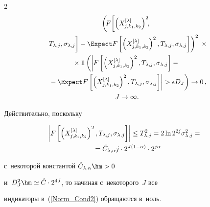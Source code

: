 \begin{multicols}{2}
\begin{multline}
\left( \!F\!\left[\left(X_{j,k_1,k_2}^{[\lambda]}\right)^2\!\!,\right.\right.\\


\left.\left.T_{\lambda,j},\sigma_{\lambda,j}


\vphantom{\left(X_{j,k_1,k_2}^{[\lambda]}\right)^2}


\right] -\Expect F\left[\left(X_{j,k_1,k_2}^{[\lambda]}\right)^2,


T_{\lambda,j},\sigma_{\lambda,j}\right]\right)^2\;\times\\


{}\times\mathbf{1}


\left( \left\vert F\left[\left(X_{j,k_1,k_2}^{[\lambda]}\right)^2,


T_{\lambda,j},\sigma_{\lambda,j}\right] -{}\right.\right.\\


\left.\left.{}-


\Expect  F\left[\left(X_{j,k_1,k_2}^{[\lambda]}\right)^2,T_{\lambda,j},\sigma_{\lambda,j}\right]\right\vert


> \epsilon D_J\right) \rightarrow 0\,,\\ J\rightarrow\infty.


\end{multline}








Действительно, поскольку


\begin{multline*}


\hspace*{-6pt}\left\vert F\left[\left(X_{j,k_1,k_2}^{[\lambda]}\right)^2,


T_{\lambda,j},\sigma_{\lambda,j}\right]\right\vert


\leq T_{\lambda,j}^2 =2\ln2^{2j}\sigma^2_{\lambda,j}


= {}\\


{}=\tilde{C}_{\lambda,\alpha} j\cdot 2^{J(1-\alpha)}\cdot 2^{j\alpha}


\end{multline*}


с~некоторой константой $\tilde{C}_{\lambda,\alpha}\hm>0$


и~$D_J^2 \hm\simeq \hat{C} \cdot2^{4J}$, то начиная с~некоторого~$J$ все


индикаторы в~(\ref{Norm_Cond2}) обращаются в~ноль.






\end{multicols}
